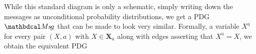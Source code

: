 \documentclass{article} %
\theoremstyle{plain}
\theoremstyle{definition}
\theoremstyle{remark}
\let\cite\citep
\newcommand\mat[1]{\mathbf{#1}}
\newcommand\Msg{\dg{M\mskip-1mus\mskip-2mu g}}
\begin{document}
While this standard diagram is only a schematic,
   simply writing down the messages as unconditional probability
   distributions, we get a PDG $\Msg$ that can be made to look very similar.
Formally, a variable $X^{a}$ for every pair
   $(X,a)$ with $X \in \mat X_a$
along with edges asserting that $X^{a} = X$,
we obtain the equivalent PDG 

\end{document}
